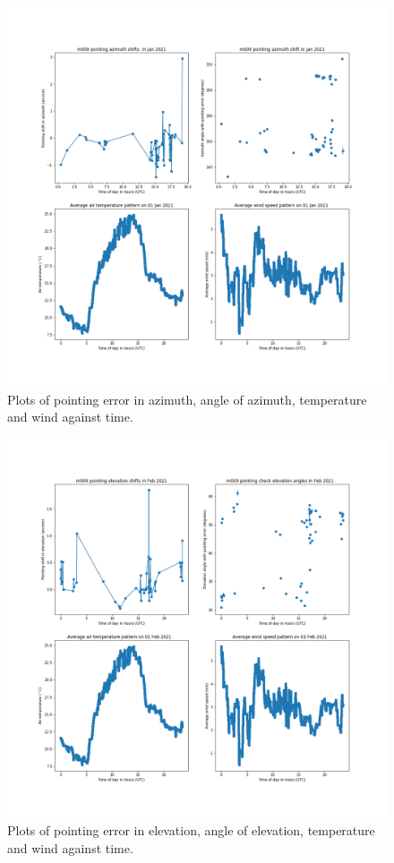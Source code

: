 \documentclass{article}
\begin{document}
\begin{figure}[H]
	\centering
	\includegraphics[scale=0.45]{m009_azim_Jan.png}
	
	\caption{Plots of pointing error in azimuth, angle of azimuth, temperature and wind against time.}
	\label{fig:m009AzimJan}
\end{figure}

\begin{figure}[H]
	\centering
	\includegraphics[scale=0.45]{m009_elev_Feb.png}
	
	\caption{Plots of pointing error in elevation, angle of elevation, temperature and wind against time.}
	\label{fig:m009ElevFeb}
\end{figure}
\end{document}
